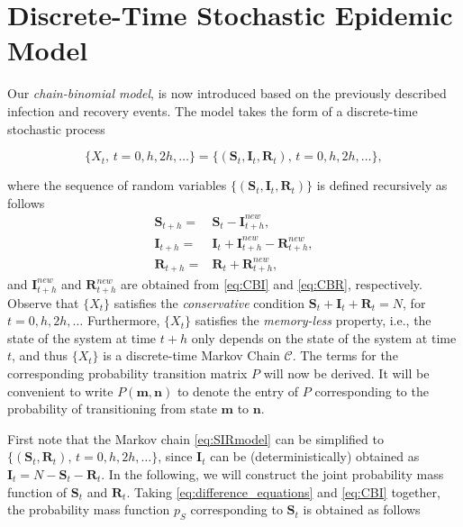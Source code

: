 \documentclass[a4paper,preprint]{elsarticle}
\renewcommand{\vec}[1]{\boldsymbol{#1}}
\begin{document}
\section{Discrete-Time Stochastic Epidemic Model}

Our \textit{chain-binomial model}, is now introduced based on the previously described infection and recovery events. The model takes the form of a discrete-time stochastic process 

\begin{equation}
\label{eq:SIRmodel}
  \{X_{t} \mbox{, }t=0,h,2h,\ldots\}=\{(\vec{S}_{t}, \vec{I}_{t}, \vec{R}_{t}) \mbox{, }t=0,h,2h,\ldots\},  
\end{equation}

where the sequence of random variables $\{(\vec{S}_{t}, \vec{I}_{t}, \vec{R}_{t})\}$ is defined recursively as follows
\begin{align}
\label{eq:difference_equations}
    \vec{S}_{t+h} = {} & \vec{S}_{t} - \vec{I}_{t+h}^{new}, \\
    \vec{I}_{t+h} = {} & \vec{I}_{t} + \vec{I}_{t+h}^{new} - \vec{R}_{t+h}^{new}, \\
    \vec{R}_{t+h} = {} & \vec{R}_{t} + \vec{R}_{t+h}^{new}, 
\label{eq:difference_equations_again}
\end{align}
%
and $\vec{I}_{t+h}^{new}$ and $\vec{R}_{t+h}^{new}$ are obtained from \eqref{eq:CBI} and \eqref{eq:CBR}, respectively. Observe that $\{X_{t}\}$ satisfies the \textit{conservative} condition $\vec{S}_t+\vec{I}_t+\vec{R}_t=N$, for $t=0,h,2h,\ldots$ Furthermore, $\{X_{t}\}$ satisfies the \textit{memory-less} property, i.e., the state of the system at time $t+h$ only depends on the state of the system at time $t$, and thus $\{X_{t}\}$ is a discrete-time Markov Chain $\mathcal{C}$. The terms for the corresponding
probability transition matrix $P$ will now be derived. It will be convenient to write $P(\vec{m},\vec{n})$ to denote the entry of $P$ corresponding to the probability of transitioning from state $\vec{m}$ to $\vec{n}$.



First note that the Markov chain \eqref{eq:SIRmodel} can be simplified to $\{(\vec{S}_{t}, \vec{R}_{t}) \mbox{, }t=0,h,2h,\ldots\}$, since $\vec{I}_{t}$ can be (deterministically) obtained as $\vec{I}_{t}=N-\vec{S}_{t}-\vec{R}_{t}$. In the following, we will construct the joint probability mass function of $\vec{S}_{t}$ and $\vec{R}_{t}$. Taking \eqref{eq:difference_equations} and \eqref{eq:CBI} together, the probability mass function  $p_S$ corresponding to $\vec{S}_{t}$ is obtained as follows
\end{document}
